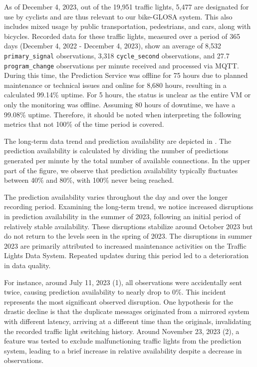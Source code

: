 As of December 4, 2023, out of the 19,951 traffic lights, 5,477 are designated for use by cyclists and are thus relevant to our bike-GLOSA system. This also includes mixed usage by public transportation, pedestrians, and cars, along with bicycles. Recorded data for these traffic lights, measured over a period of 365 days (December 4, 2022 - December 4, 2023), show an average of 8,532 \texttt{primary\_signal} observations, 3,318 \texttt{cycle\_second} observations, and 27.7 \texttt{program\_change} observations per minute received and processed via MQTT. During this time, the Prediction Service was offline for 75 hours due to planned maintenance or technical issues and online for 8,680 hours, resulting in a calculated 99.14\% uptime. For 5 hours, the status is unclear as the entire VM or only the monitoring was offline. Assuming 80 hours of downtime, we have a 99.08\% uptime. Therefore, it should be noted when interpreting the following metrics that not 100\% of the time period is covered.

The long-term data trend and prediction availability are depicted in . The prediction availability is calculated by dividing the number of predictions generated per minute by the total number of available connections. In the upper part of the figure, we observe that prediction availability typically fluctuates between 40\% and 80\%, with 100\% never being reached.

The prediction availability varies throughout the day and over the longer recording period. Examining the long-term trend, we notice increased disruptions in prediction availability in the summer of 2023, following an initial period of relatively stable availability. These disruptions stabilize around October 2023 but do not return to the levels seen in the spring of 2023. The disruptions in summer 2023 are primarily attributed to increased maintenance activities on the Traffic Lights Data System. Repeated updates during this period led to a deterioration in data quality. 

For instance, around July 11, 2023 (1), all observations were accidentally sent twice, causing prediction availability to nearly drop to 0\%. This incident represents the most significant observed disruption. One hypothesis for the drastic decline is that the duplicate messages originated from a mirrored system with different latency, arriving at a different time than the originals, invalidating the recorded traffic light switching history. Around November 23, 2023 (2), a feature was tested to exclude malfunctioning traffic lights from the prediction system, leading to a brief increase in relative availability despite a decrease in observations.

